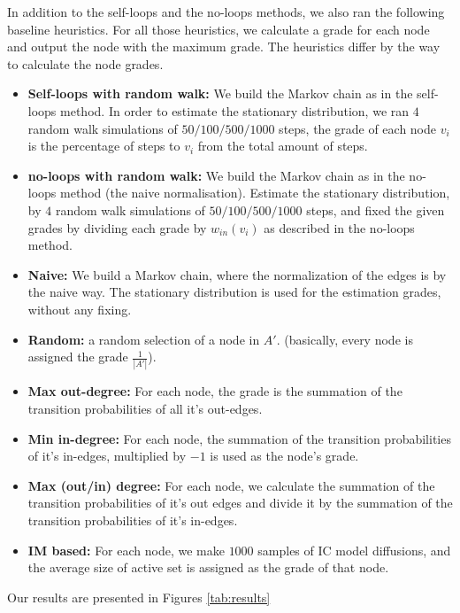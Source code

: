 \documentclass[sigconf,anonymous]{aamas}
\begin{document}
In addition to the self-loops and the no-loops methods, we also ran the following baseline heuristics. For all those heuristics, we calculate a grade for each node and output the node with the maximum grade. The heuristics differ by the way to calculate the node grades.
\begin{itemize}
    \item \textbf{Self-loops with random walk:} We build the Markov chain as in the self-loops method. In order to estimate the stationary distribution, we ran $4$ random walk simulations of $50/100/500/1000$ steps, the grade of each node $v_i$ is the percentage of steps to $v_i$ from the total amount of steps. 
    \item \textbf{no-loops with random walk:} We build the Markov chain as in the no-loops method (the naive normalisation). Estimate the stationary distribution, by $4$ random walk simulations of $50/100/500/1000$ steps, and fixed the given grades by dividing each grade by $w_{in}(v_i)$ as described in the no-loops method. 
    \item \textbf{Naive:} We build a Markov chain, where the normalization of the edges is by the naive way. The stationary distribution is used for the estimation grades, without any fixing.
    \item \textbf{Random:} a random selection of a node in $A'$. (basically, every node is assigned the grade $\frac{1}{|A'|}$).
    \item \textbf{Max out-degree:} For each node, the grade is the summation of the transition probabilities of all it's out-edges.
    \item \textbf{Min in-degree:} For each node, the summation of the transition probabilities of it's in-edges, multiplied by $-1$ is used as the node's grade.
    \item \textbf{Max (out/in) degree:} For each node, we calculate the summation of the transition probabilities of it's out edges and divide it by the summation of the transition probabilities of it's in-edges.
    \item \textbf{IM based:} For each node, we make $1000$ samples of IC model diffusions, and the average size of active set is assigned as the grade of that node.
\end{itemize}

Our results are presented in Figures \ref{tab:results}
\end{document}
